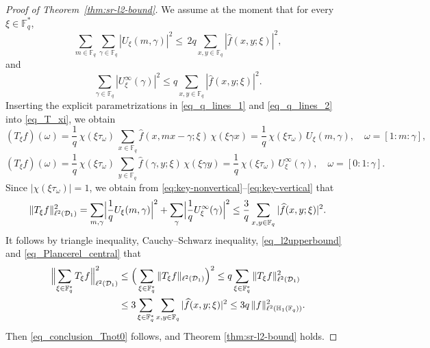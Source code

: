\documentclass[11pt]{article}
\newcommand{\1}{\mathbf 1}
\begin{document}
\begin{proof}[Proof of Theorem~\ref{thm:sr-l2-bound}]
We assume at the moment that for every $\xi\in\mathbb F_q^\ast$,
\begin{equation}\label{eq:key-nonvertical}
\sum_{m\in\mathbb F_q}\sum_{\gamma\in\mathbb F_q}
|U_\xi(m,\gamma)|^2
\leq\,2q
\sum_{x,y\in\mathbb F_q}|\widehat f(x,y;\xi)|^2,
\end{equation}
and
\begin{equation}\label{eq:key-vertical}
\sum_{\gamma\in\mathbb F_q}
|U_\xi^\infty(\gamma)|^2
\le
q
\sum_{x,y\in\mathbb F_q}|\widehat f(x,y;\xi)|^2.
\end{equation}
Inserting the explicit parametrizations in \eqref{eq_q_lines_1} and \eqref{eq_q_lines_2} into \eqref{eq_T_xi}, we obtain
\[
(T_\xi f)(\omega)
=
\frac1q\,\chi(\xi\tau_\omega)\,
\sum_{x\in\mathbb F_q}\widehat f(x,mx-\gamma;\xi)\,\chi(\xi\gamma x)
=\frac1q\,\chi(\xi\tau_\omega)\,U_\xi(m,\gamma),\quad \omega=[1:m:\gamma],
\]
\[
(T_\xi f)(\omega)
=
\frac1q\,\chi(\xi\tau_\omega)\,
\sum_{y\in\mathbb F_q}\widehat f(\gamma,y;\xi)\,\chi(\xi\gamma y)
=\frac1q\,\chi(\xi\tau_\omega)\,U_\xi^\infty(\gamma),\quad \omega=[0:1:\gamma].
\]
Since $|\chi(\xi\tau_\omega)|=1$, we obtain from \eqref{eq:key-nonvertical}--\eqref{eq:key-vertical} that
\begin{equation} \label{eq_l2upperbound}
\|T_\xi f\|_{\ell^2(\mathcal D_1)}^2
=
\sum_{m,\gamma}\Bigl|\frac1q U_\xi(m,\gamma)\Bigr|^2
+
\sum_{\gamma}\Bigl|\frac1q U_\xi^\infty(\gamma)\Bigr|^2
\leq { \frac{3}{q}} \sum_{x,y\in\mathbb F_q}|\widehat f(x,y;\xi)|^2.
\end{equation}
It follows by triangle inequality, Cauchy--Schwarz inequality, \eqref{eq_l2upperbound} and  \eqref{eq_Plancerel_central} that
\begin{align*}
\Bigl\|\sum_{\xi\in\mathbb F_q^*}T_\xi f\Bigr\|_{\ell^2(\mathcal D_1)}^2
&\le
\Big(\sum_{\xi\in\mathbb F_q^*}\|T_\xi f\|_{\ell^2(\mathcal D_1)}\Big)^2
\le
q  \sum_{\xi\in\mathbb F_q^*}\|T_\xi f\|_{\ell^2(\mathcal D_1)}^2\\
& \leq { 3}\sum_{\xi\in\mathbb F_q^*}\sum_{x,y\in\mathbb F_q}|\widehat f(x,y;\xi)|^2 \leq 
{ 3}q\,\|f\|_{\ell^2(\mathbb H_1(\mathbb F_q))}^2.
\end{align*}
Then \eqref{eq_conclusion_Tnot0} follows, and Theorem \ref{thm:sr-l2-bound} holds. 



\medskip


\end{proof}
\end{document}
